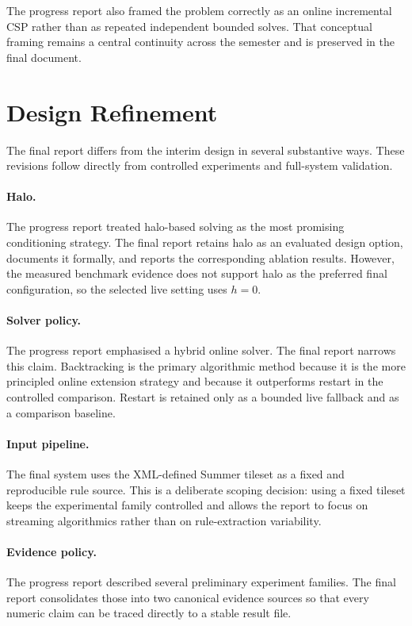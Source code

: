 \documentclass[12pt,a4paper]{report}
\begin{document}
The progress report also framed the problem correctly as an online incremental CSP rather than as repeated independent bounded solves. That conceptual framing remains a central continuity across the semester and is preserved in the final document.

\section{Design Refinement}
The final report differs from the interim design in several substantive ways. These revisions follow directly from controlled experiments and full-system validation.

\paragraph{Halo.} The progress report treated halo-based solving as the most promising conditioning strategy. The final report retains halo as an evaluated design option, documents it formally, and reports the corresponding ablation results. However, the measured benchmark evidence does not support halo as the preferred final configuration, so the selected live setting uses $h=0$.

\paragraph{Solver policy.} The progress report emphasised a hybrid online solver. The final report narrows this claim. Backtracking is the primary algorithmic method because it is the more principled online extension strategy and because it outperforms restart in the controlled comparison. Restart is retained only as a bounded live fallback and as a comparison baseline.

\paragraph{Input pipeline.} The final system uses the XML-defined Summer tileset as a fixed and reproducible rule source. This is a deliberate scoping decision: using a fixed tileset keeps the experimental family controlled and allows the report to focus on streaming algorithmics rather than on rule-extraction variability.

\paragraph{Evidence policy.} The progress report described several preliminary experiment families. The final report consolidates those into two canonical evidence sources so that every numeric claim can be traced directly to a stable result file.
\end{document}

